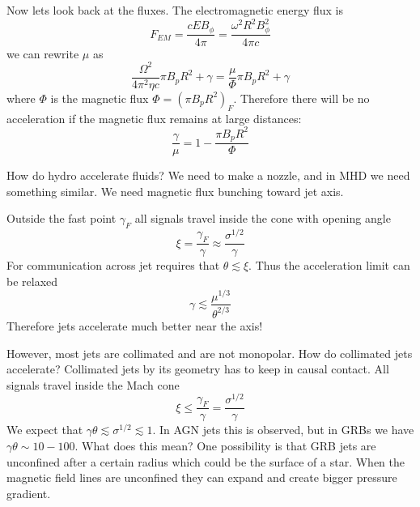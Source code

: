 \documentclass[letterpaper, 11pt]{article}
\numberwithin{equation}{section}
\numberwithin{figure}{section}
\begin{document}
Now lets look back at the fluxes. The electromagnetic energy flux is
\begin{equation}
  \label{eq:11}
  F_{EM} = \frac{cEB_{\phi}}{4\pi} = \frac{\omega^2R^2B_{\phi}^2}{4\pi c}
\end{equation}
we can rewrite $\mu$ as
\begin{equation}
  \label{eq:12}
  \frac{\Omega^2}{4\pi^2\eta c}\pi B_pR^2 + \gamma = \frac{\mu}{\Phi}\pi B_pR^2 + \gamma
\end{equation}
where $\Phi$ is the magnetic flux $\Phi = (\pi B_pR^2)_F$. Therefore there will
be no acceleration if the magnetic flux remains at large distances:
\begin{equation}
  \label{eq:13}
  \frac{\gamma}{\mu} = 1 - \frac{\pi B_pR^2}{\Phi}
\end{equation}

How do hydro accelerate fluids? We need to make a nozzle, and in MHD we need
something similar. We need magnetic flux bunching toward jet axis.

Outside the fast point $\gamma_{F}$ all signals travel inside the cone with
opening angle
\begin{equation}
  \label{eq:14}
  \xi = \frac{\gamma_F}{\gamma} \approx \frac{\sigma^{1/2}}{\gamma}
\end{equation}
For communication across jet requires that $\theta \lesssim \xi$. Thus the
acceleration limit can be relaxed
\begin{equation}
  \label{eq:15}
  \gamma \lesssim \frac{\mu^{1/3}}{\theta^{2/3}}
\end{equation}
Therefore jets accelerate much better near the axis!

However, most jets are collimated and are not monopolar. How do collimated jets
accelerate? Collimated jets by its geometry has to keep in causal contact. All
signals travel inside the Mach cone
\begin{equation}
  \label{eq:16}
  \xi \leq \frac{\gamma_F}{\gamma} = \frac{\sigma^{1/2}}{\gamma}
\end{equation}
We expect that $\gamma\theta \lesssim \sigma^{1/2} \lesssim 1$. In AGN jets this
is observed, but in GRBs we have $\gamma\theta \sim 10-100$. What does this
mean? One possibility is that GRB jets are unconfined after a certain radius
which could be the surface of a star. When the magnetic field lines are
unconfined they can expand and create bigger pressure gradient.
\end{document}
